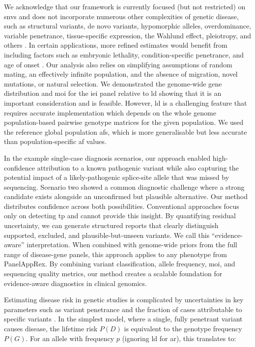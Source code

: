 We acknowledge that our framework is currently focused (but not restricted) on \ac{snv}s and does not incorporate numerous other complexities of genetic disease, such as structural variants, de novo variants, hypomorphic alleles, overdominance, variable penetrance, tissue-specific expression, the Wahlund effect, pleiotropy, and others \cite{zschocke_mendelian_2023}. 
In certain applications, more refined estimates would benefit from including factors such as embryonic lethality, condition-specific penetrance, and age of onset \cite{hannah_using_2024}. 
Our analysis also relies on simplifying assumptions of random mating, an effectively infinite population, and the absence of migration, novel mutations, or natural selection.
We demonstrated the genome-wide gene distribution and \ac{moi} for the \ac{iei} panel relative to \ac{ld} showing that it is an important consideration and is feasible.
However, \ac{ld} is a challenging feature that requires accurate implementation which depends on the whole genome population-based pairwise genotype matrices for the given population. 
We used the reference global population \ac{af}s, which is more generalisable but less accurate than population-specific \ac{af} values.

In the example single-case diagnosis scenarios, our approach enabled high-confidence attribution to a known pathogenic variant while also capturing the potential impact of a likely-pathogenic splice-site allele that was missed by sequencing. Scenario two showed a common diagnostic challenge where a strong candidate exists alongside an unconfirmed but plausible alternative. Our method distributes confidence across both possibilities. Conventional approaches focus only on detecting \ac{tp} and cannot provide this insight. By quantifying residual uncertainty, we can generate structured reports that clearly distinguish supported, excluded, and plausible-but-unseen variants. We call this ``evidence-aware'' interpretation.
When combined with genome-wide priors from the full range of disease-gene panels, this approach applies to any phenotype from PanelAppRex. By combining variant classification, allele frequency, \ac{moi}, and sequencing quality metrics, our method creates a scalable foundation for evidence-aware diagnostics in clinical genomics.

Estimating disease risk in genetic studies is complicated by uncertainties in key parameters such as variant penetrance and the fraction of cases attributable to specific variants \cite{zschocke_mendelian_2023}. 
In the simplest model, where a single, fully penetrant variant causes disease, the lifetime risk \(P(D)\) is equivalent to the genotype frequency \(P(G)\). 
For an allele with frequency \(p\) (ignoring \ac{ld} for \ac{ar}), this translates to:

